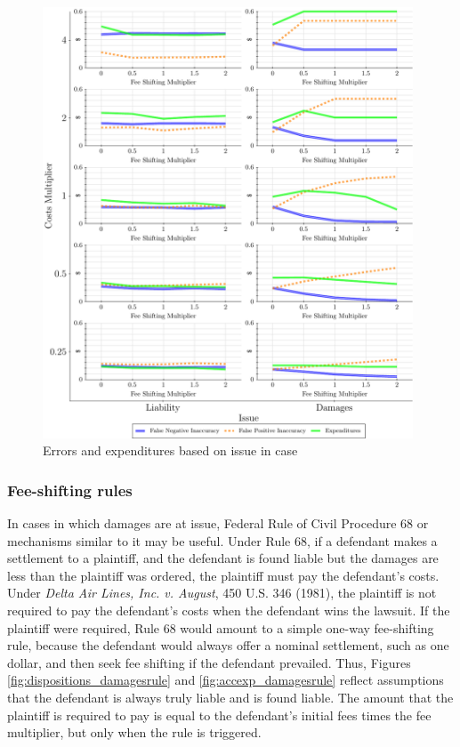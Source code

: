 \documentclass{article}
\begin{document}
\begin{figure}
\begin{minipage}{0.48\textwidth}
        \includegraphics[width=0.98\textwidth, scale=0.70, trim={0in 0in 0in 0in}, clip]{../Figures/Accuracy and Expenditures Varying Issue} %
        \caption{Errors and expenditures based on issue in case}
		\label{fig:accexp_issue}
    \end{minipage}
\end{figure}

\subsubsection{Fee-shifting rules}

In cases in which damages are at issue, Federal Rule of Civil Procedure 68 or mechanisms similar to it may be useful. Under Rule 68, if a defendant makes a settlement to a plaintiff, and the defendant is found liable but the damages are less than the plaintiff was ordered, the plaintiff must pay the defendant's costs. Under \textit{Delta Air Lines, Inc. v. August}, 450 U.S. 346 (1981), the plaintiff is not required to pay the defendant's costs when the defendant wins the lawsuit. If the plaintiff were required, Rule 68 would amount to a simple one-way fee-shifting rule, because the defendant would always offer a nominal settlement, such as one dollar, and then seek fee shifting if the defendant prevailed. Thus, Figures \ref{fig:dispositions_damagesrule} and \ref{fig:accexp_damagesrule} reflect assumptions that the defendant is always truly liable and is found liable. The amount that the plaintiff is required to pay is equal to the defendant's initial fees times the fee multiplier, but only when the rule is triggered.  
\end{document}
